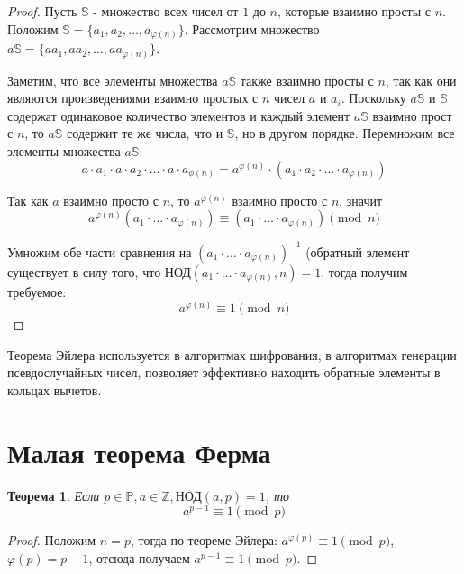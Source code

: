 \documentclass[12pt, a4paper, openany]{book}
\newtheorem*{theorem}{Теорема}
\begin{document}
\begin{proof}
    Пусть $\mathbb{S}$ - множество всех чисел от $1$ до $n$, которые взаимно просты с $n$. 
    Положим $\mathbb{S} = \{a_1, a_2, \ldots, a_{\varphi(n)}\}$. Рассмотрим множество $a\mathbb{S} = \{aa_1, aa_2, \ldots, aa_{\varphi(n)}\}$. 
    
    Заметим, что все элементы множества $a\mathbb{S}$ также взаимно просты с $n$, так как они являются произведениями взаимно простых с $n$ чисел $a$ и $a_i$. Поскольку $a\mathbb{S}$ и $\mathbb{S}$ содержат одинаковое количество элементов и каждый элемент $a\mathbb{S}$ взаимно прост с $n$, то $a\mathbb{S}$ содержит те же числа, что и $\mathbb{S}$, но в другом порядке. Перемножим все элементы множества $a\mathbb{S}$:
    \[
    a \cdot a_1 \cdot a \cdot a_2 \cdot \ldots \cdot a \cdot a_{\phi(n)} = a^{\varphi(n)} \cdot (a_1 \cdot a_2 \cdot \ldots \cdot a_{\varphi(n)})
    \]
    
    Так как $a$ взаимно просто с $n$, то $a^{\varphi(n)}$ взаимно просто с $n$, значит
    \[
    a^{\varphi(n)} (a_1 \cdot \ldots \cdot a_{\varphi(n)}) \equiv (a_1 \cdot \ldots \cdot a_{\varphi(n)}) \pmod{n}
    \]
    
    Умножим обе части сравнения на $(a_1 \cdot \ldots \cdot a_{\varphi(n)})^{-1}$ (обратный элемент существует в силу того, что $\text{НОД}(a_1 \cdot \ldots \cdot a_{\varphi(n)}, n) = 1$, тогда получим требуемое:
    \[
    a^{\varphi(n)} \equiv 1 \pmod{n}
    \]

\end{proof}

    Теорема Эйлера используется в алгоритмах шифрования, в алгоритмах генерации псевдослучайных чисел, позволяет эффективно находить обратные элементы в кольцах вычетов.

\section{Малая теорема Ферма}

\begin{theorem}
    Если $p \in \mathbb{P}, a \in \mathbb{Z}, \text{НОД}(a, p) = 1$, то
    \[
    a^{p-1} \equiv 1 \pmod{p}
    \]
\end{theorem}

\begin{proof}
    Положим $n = p$, тогда по теореме Эйлера: $a^{\varphi(p)} \equiv 1 \pmod{p}$, $\varphi(p) = p -1$, отсюда получаем $a^{p-1} \equiv 1 \pmod{p}$.
\end{proof}
\end{document}
